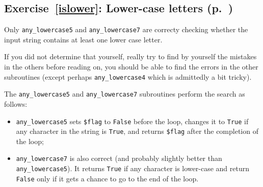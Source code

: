 \subsection{Exercise~\ref{islower}: Lower-case letters (p.~\pageref{islower})}
\label{sol_islower}

Only \verb'any_lowercase5' and \verb'any_lowercase7' are correcty 
checking whether the input string contains at least one lower 
case letter.

If you did not determine that yourself, really try to find by 
yourself the mistakes in the others before reading on, you should be 
able to find the errors in the other subroutines (except 
perhaps \verb'any_lowercase4' which is admittedly a bit tricky).

The \verb'any_lowercase5' and \verb'any_lowercase7' subroutines 
perform the search as follows:

\begin{itemize} 
\item \verb'any_lowercase5' sets {\tt \$flag} 
to {\tt False} before the loop, changes it to {\tt True} if 
any character in the string is {\tt True}, and returns 
{\tt \$flag} after the completion of the loop;

\item  \verb'any_lowercase7' is also correct (and probably slightly 
better than \verb'any_lowercase5'). It returns {\tt True} if 
any character is lower-case and return {\tt False} only if 
it gets a chance to go to the end of the loop.
\end{itemize}

